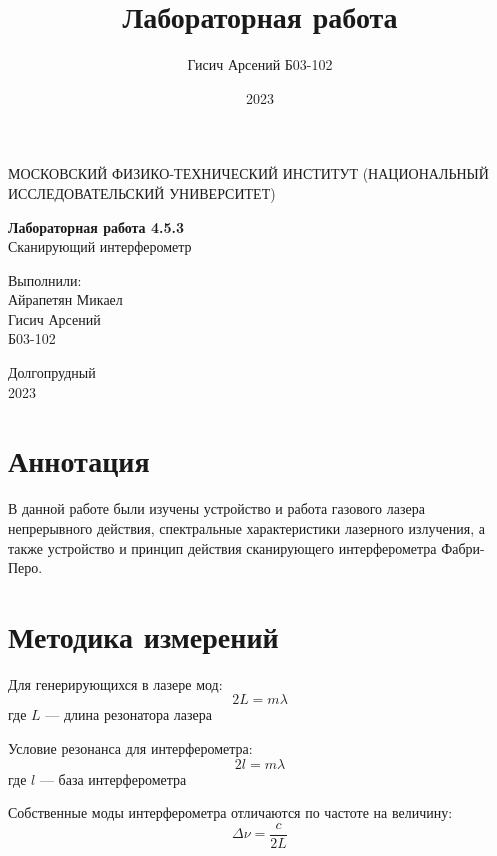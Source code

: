 \documentclass[a4paper, 12pt]{article}
\title{Лабораторная работа}
\author{Гисич Арсений Б03-102}
\date{2023}
\begin{document}
	\begin{center}
		{\large МОСКОВСКИЙ ФИЗИКО-ТЕХНИЧЕСКИЙ ИНСТИТУТ (НАЦИОНАЛЬНЫЙ ИССЛЕДОВАТЕЛЬСКИЙ УНИВЕРСИТЕТ)}
	\end{center}
	\vspace{5 cm}
	{\Large
		\begin{center}
			{\bf Лабораторная работа 4.5.3}\\[0.2 cm]
			Сканирующий интерферометр
		\end{center}
	}
	\vspace{4 cm}
	\begin{flushright}
		{\Large Выполнили: \\
			\vspace{0.2 cm}
			Айрапетян Микаел \\
			Гисич Арсений \\
			\vspace{0.2 cm}
			Б03-102 \\}
	\end{flushright}
	\vspace{8 cm}
	\begin{center}
		Долгопрудный\\[0.1 cm]
		2023
	\end{center}
\thispagestyle{empty}

\section{Аннотация}

В данной работе были изучены устройство и работа газового лазера непрерывного действия, спектральные характеристики лазерного излучения, а также устройство и принцип действия сканирующего интерферометра Фабри-Перо.

\section{Методика измерений}

Для генерирующихся в лазере мод:
\begin{equation} \label{eq:rez_modes}
2L = m\lambda
\end{equation}
\noindent где $L$ --- длина резонатора лазера

Условие резонанса для интерферометра:
\begin{equation} \label{eq:int_modes}
2l = m\lambda
\end{equation}
\noindent где $l$ --- база интерферометра

Собственные моды интерферометра отличаются по частоте на величину:
\begin{equation} \label{eq:nu_dif}
\Delta \nu = \frac{c}{2L}
\end{equation}
\end{document}
